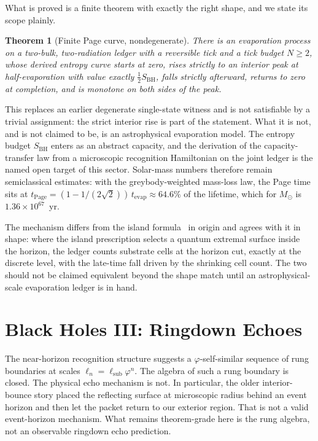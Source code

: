 \documentclass[11pt,letterpaper]{article}
\newtheorem{theorem}{Theorem}[section]
\theoremstyle{definition}
\newcommand{\phiG}{\varphi}
\newcommand{\bsub}{\mathrm{sub}}
\newcommand{\BH}{\mathrm{BH}}
\newcommand{\Page}{\mathrm{Page}}
\newcommand{\half}{\tfrac{1}{2}}
\begin{document}
What is proved is a finite theorem with exactly the right shape, and
we state its scope plainly.

\begin{theorem}[Finite Page curve, nondegenerate]\label{thm:page}
There is an evaporation process on a two-bulk, two-radiation ledger
with a reversible tick and a tick budget $N\ge2$, whose derived
entropy curve starts at zero, rises strictly to an interior peak at
half-evaporation with value exactly $\half S_\BH$, falls strictly
afterward, returns to zero at completion, and is monotone on both
sides of the peak.
\end{theorem}

This replaces an earlier degenerate single-state witness and is not
satisfiable by a trivial assignment: the strict interior rise is part
of the statement.  What it is not, and is not claimed to be, is an
astrophysical evaporation model.  The entropy budget $S_\BH$ enters as
an abstract capacity, and the derivation of the capacity-transfer law
from a microscopic recognition Hamiltonian on the joint ledger is the
named open target of this sector.  Solar-mass numbers therefore remain
semiclassical estimates: with the greybody-weighted mass-loss law, the
Page time sits at $t_\Page=(1-1/(2\sqrt2))\,t_{\mathrm{evap}}
\approx 64.6\%$ of the lifetime, which for $M_\odot$ is
$1.36\times10^{67}$~yr.

The mechanism differs from the island formula~\cite{AEMM2019,
Penington2019} in origin and agrees with it in shape: where the island
prescription selects a quantum extremal surface inside the horizon,
the ledger counts substrate cells at the horizon cut, exactly at the
discrete level, with the late-time fall driven by the shrinking cell
count.  The two should not be claimed equivalent beyond the shape
match until an astrophysical-scale evaporation ledger is in hand.

\section{Black Holes III: Ringdown Echoes}
\label{sec:echoes}

The near-horizon recognition structure suggests a $\phiG$-self-similar
sequence of rung boundaries at scales $\ell_n=\ell_\bsub\phiG^n$.  The
algebra of such a rung boundary is closed.  The physical echo mechanism
is not.  In particular, the older interior-bounce story placed the
reflecting surface at microscopic radius behind an event horizon and
then let the packet return to our exterior region.  That is not a
valid event-horizon mechanism.  What remains theorem-grade here is the
rung algebra, not an observable ringdown echo prediction.
\end{document}

